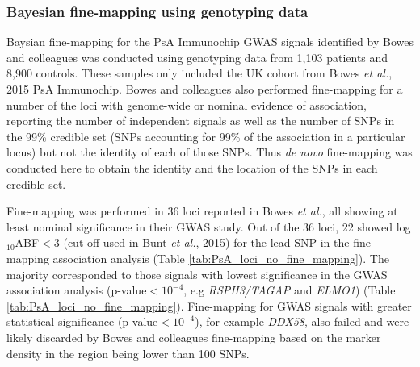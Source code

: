 \subsubsection{Bayesian fine-mapping using genotyping data}

Baysian fine-mapping for the PsA Immunochip GWAS signals identified by Bowes and colleagues \parencite{Bowes2015} was conducted using genotyping data from 1,103 patients and 8,900 controls. These samples only included the UK cohort from Bowes \textit{et al.}, 2015 PsA Immunochip. Bowes and colleagues also performed fine-mapping for a number of the loci with genome-wide or nominal evidence of association, reporting the number of independent signals as well as the number of SNPs in the 99\% credible set (SNPs accounting for 99\% of the association in a particular locus) but not the identity of each of those SNPs. Thus \textit{de novo} fine-mapping was conducted here to obtain the identity and the location of the SNPs in each credible set. %

Fine-mapping was performed in 36 loci reported in Bowes \textit{et al.}, all showing at least nominal significance in their GWAS study. Out of the 36 loci, 22 showed log$_{10}$ABF$<$3 (cut-off used in Bunt \textit{et al.}, 2015) for the lead SNP in the fine-mapping association analysis (Table \ref{tab:PsA_loci_no_fine_mapping}). The majority corresponded to those signals with lowest significance in the GWAS association analysis (p-value$<10^{-4}$, e.g \textit{RSPH3/TAGAP} and \textit{ELMO1}) (Table \ref{tab:PsA_loci_no_fine_mapping}). Fine-mapping for GWAS signals with greater statistical significance (p-value$<10^{-4}$), for example \textit{DDX58}, also failed and were likely discarded by Bowes and colleagues fine-mapping based on the marker density in the region being lower than 100 SNPs. 
 

